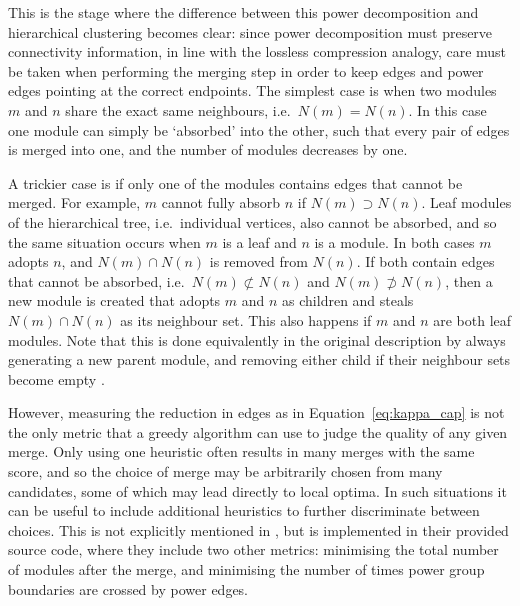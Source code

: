 This is the stage where the difference between this power decomposition and hierarchical clustering becomes clear: since power decomposition must preserve connectivity information, in line with the lossless compression analogy, care must be taken when performing the merging step in order to keep edges and power edges pointing at the correct endpoints. 
The simplest case is when two modules $m$ and $n$ share the exact same neighbours, i.e.\ $N(m)=N(n)$. In this case one module can simply be `absorbed' into the other, such that every pair of edges is merged into one, and the number of modules decreases by one. 

A trickier case is if only one of the modules contains edges that cannot be merged. For example, $m$ cannot fully absorb $n$ if $N(m)\supset N(n)$. Leaf modules of the hierarchical tree, i.e.\ individual vertices, also cannot be absorbed, and so the same situation occurs when $m$ is a leaf and $n$ is a module. In both cases $m$ adopts $n$, and $N(m)\cap N(n)$ is removed from $N(n)$.
If both contain edges that cannot be absorbed, i.e.\ $N(m)\not\subset N(n)$ and $N(m)\not\supset N(n)$, then a new module is created that adopts $m$ and $n$ as children and steals $N(m)\cap N(n)$ as its neighbour set. This also happens if $m$ and $n$ are both leaf modules.
Note that this is done equivalently in the original description by always generating a new parent module, and removing either child if their neighbour sets become empty \cite{Dwyer2014}.

However, measuring the reduction in edges as in Equation~\eqref{eq:kappa_cap} is not the only metric that a greedy algorithm can use to judge the quality of any given merge.
Only using one heuristic often results in many merges with the same score, and so the choice of merge may be arbitrarily chosen from many candidates, some of which may lead directly to local optima. In such situations it can be useful to include additional heuristics to further discriminate between choices.
This is not explicitly mentioned in \cite{Dwyer2014}, but is implemented in their provided source code, where they include two other metrics: minimising the total number of modules after the merge, and minimising the number of times power group boundaries are crossed by power edges.

